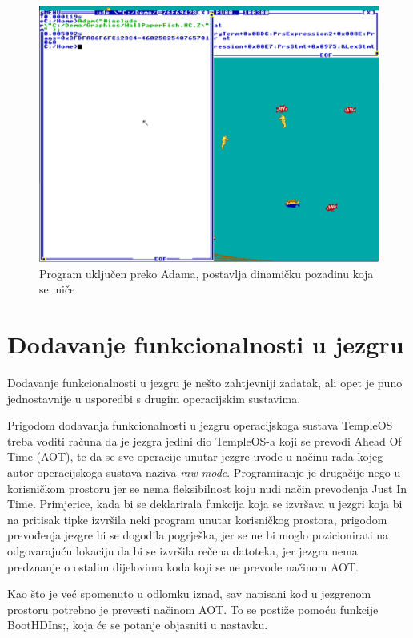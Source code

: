 \documentclass{foi}
\begin{document}
\begin{figure}[H]
    \centering
    \includegraphics[width=1.0\textwidth]{slike/adamwp.png}
	\caption{Program uključen preko Adama, postavlja dinamičku pozadinu koja se miče}
    \label{fig:adamwp}
\end{figure}

\section{Dodavanje funkcionalnosti u jezgru}

Dodavanje funkcionalnosti u jezgru je nešto zahtjevniji zadatak, ali opet je puno jednostavnije u usporedbi s drugim operacijskim sustavima.

Prigodom dodavanja funkcionalnosti u jezgru operacijskoga sustava TempleOS treba voditi računa da je jezgra jedini dio TempleOS-a koji se prevodi Ahead Of Time (AOT), te da se sve operacije unutar jezgre uvode u načinu rada kojeg autor operacijskoga sustava naziva \emph{raw mode}. Programiranje je drugačije nego u korisničkom prostoru jer se nema fleksibilnost koju nudi način prevođenja Just In Time. Primjerice, kada bi se deklarirala funkcija koja se izvršava u jezgri koja bi na pritisak tipke izvršila neki program unutar korisničkog prostora, prigodom prevođenja jezgre bi se dogodila pogrješka, jer se ne bi moglo pozicionirati na odgovarajuću lokaciju da bi se izvršila rečena datoteka, jer jezgra nema predznanje o ostalim dijelovima koda koji se ne prevode načinom AOT.

Kao što je već spomenuto u odlomku iznad, sav napisani kod u jezgrenom prostoru potrebno je prevesti načinom AOT. To se postiže pomoću funkcije {\selectfont BootHDIns;}, koja će se potanje objasniti u nastavku.
\end{document}
